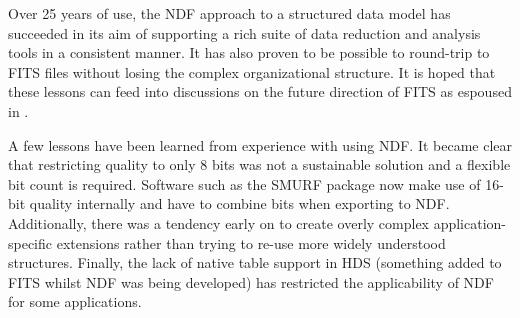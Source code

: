 \documentclass[11pt,twoside]{article}
\begin{document}
Over 25 years of use, the NDF approach to a structured data model has
succeeded in its aim of supporting a rich suite of data reduction and
analysis tools in a consistent manner. It has also proven to be
possible to round-trip to FITS files without losing the complex
organizational structure. It is hoped that these lessons can feed into
discussions on the future direction of FITS as espoused in
\citet{P90_adassxxiii}.

A few lessons have been learned from experience with using NDF. It
became clear that restricting quality to only 8 bits was not a
sustainable solution and a flexible bit count is required. Software
such as the SMURF package \citep{2013MNRAS.430.2545C} now make use of
16-bit quality internally and have to combine bits when exporting to
NDF. Additionally, there was a tendency early on to create overly
complex application-specific extensions rather than trying to re-use
more widely understood structures. Finally, the lack of native table
support in HDS (something added to FITS \citep{1988A&AS...73..365H}
whilst NDF was being developed) has restricted the applicability of
NDF for some applications.


\end{document}
